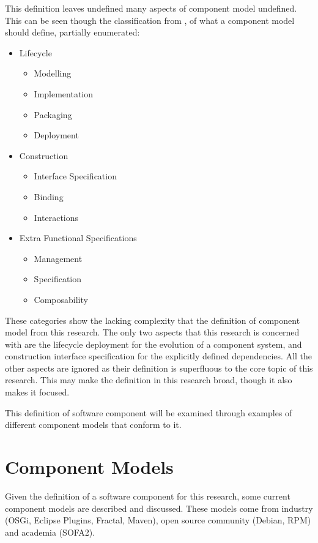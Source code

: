 This definition leaves undefined many aspects of component model undefined. 
This can be seen though the classification from \cite{Crnkovic2011}, of what a component model should define, partially enumerated:
\begin{itemize}
  \item Lifecycle 
  		\begin{itemize}
	  		\item Modelling
	  		\item Implementation
	  		\item Packaging
	  		\item Deployment
		\end{itemize}
	\item Construction
		\begin{itemize}
	  		\item Interface Specification
	  		\item Binding
	  		\item Interactions 
		\end{itemize}
	\item Extra Functional Specifications
		\begin{itemize}
	  		\item Management
	  		\item Specification
	  		\item Composability
		\end{itemize}	
\end{itemize}  
These categories show the lacking complexity that the definition of component model from this research.
The only two aspects that this research is concerned with are the lifecycle deployment for the evolution of a component system, 
and construction interface specification for the explicitly defined dependencies.
All the other aspects are ignored as their definition is superfluous to the core topic of this research.
This may make the definition in this research broad, though it also makes it focused.

This definition of software component will be examined through examples of different component models that conform to it.

\section{Component Models}
\label{background.models}
Given the definition of a software component for this research, some current component models are described and discussed.
These models come from industry (OSGi, Eclipse Plugins, Fractal, Maven), open source community (Debian, RPM) and academia (SOFA2).

